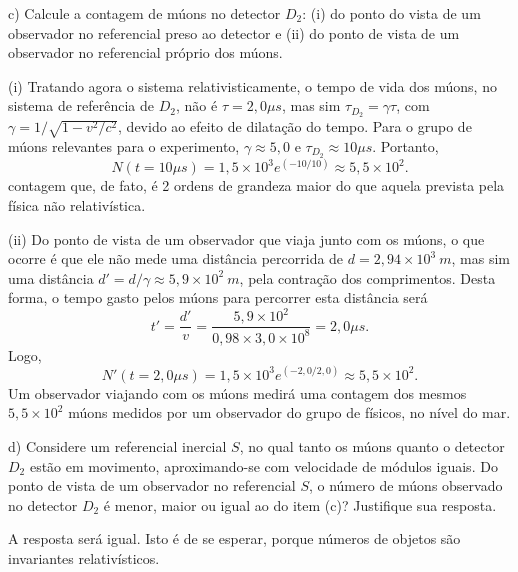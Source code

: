 \begin{enumerate}[start=1,label={\bfseries Q\arabic*.}]
  c) Calcule a contagem de múons no detector $D_{2}$: (i) do ponto do vista de um observador no referencial preso ao detector e (ii) do ponto de vista de um observador no referencial próprio dos múons.

\resposta  (i) Tratando agora o sistema relativisticamente, o tempo de vida dos múons, no sistema de referência de $D_{2}$, não é $\tau = 2,0 \mu s$, mas sim $\tau_{D_{2}} = \gamma \tau$, com $\gamma = 1 / \sqrt{1 - v^{2}/c^{2} }$, devido ao efeito de dilatação do tempo. Para o grupo de múons relevantes para o experimento, $\gamma \approx 5,0$ e $\tau_{D_{2}} \approx 10 \mu s$. Portanto,
$$
N(t = 10 \mu s) = 1,5 \times 10^{3} e^{(-10/10)} \approx 5,5 \times 10^{2}.
$$
contagem que, de fato, é 2 ordens de grandeza maior do que aquela prevista pela física não relativística.

(ii) Do ponto de vista de um observador que viaja junto com os múons, o que ocorre é que ele não mede uma distância percorrida de $d = 2,94 \times 10^{3} \ m$, mas sim uma distância $d' = d/\gamma \approx 5,9 \times 10^{2} \ m$, pela contração dos comprimentos. Desta forma, o tempo gasto pelos múons para
percorrer esta distância será
$$
t' = \frac{d'}{v} = \frac{5,9 \times 10^{2}}{0,98 \times 3,0 \times 10^{8}} = 2,0 \mu s.
$$
Logo,
$$
N'(t = 2,0 \mu s) = 1,5 \times 10^{3} e^{(-2,0/2,0)} \approx 5,5 \times 10^{2}.
$$
Um observador viajando com os múons medirá uma contagem dos mesmos $5,5 \times 10^{2}$ múons medidos por um observador do grupo de físicos, no nível do mar.


  d) Considere um referencial inercial $S$, no qual tanto os múons quanto o detector $D_{2}$ estão em movimento, aproximando-se com velocidade de módulos iguais. Do ponto de vista de um observador no referencial $S$, o número de múons observado no detector $D_{2}$ é menor, maior ou igual ao do item (c)? Justifique sua resposta.

\resposta A resposta será igual. Isto é de se esperar, porque números de objetos são invariantes relativísticos.







\end{enumerate}
